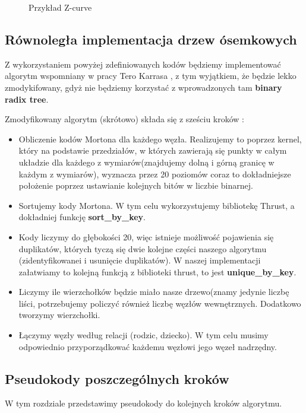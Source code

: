 \documentclass[14pt,twoside,a4paper]{article}
\theoremstyle{definition}
\begin{document}
\begin{figure}[h]
    \centering      
    \def\svgscale{0.53}
    
    \caption{Przykład Z-curve}
    \label{fig:krzywa}
\end{figure}

\subsection{\Large Równoległa implementacja drzew ósemkowych}
Z wykorzystaniem powyżej zdefiniowanych kodów będziemy implementować algorytm wspomniany w pracy Tero Karrasa \cite{tero}, z tym wyjątkiem, że będzie lekko zmodykifowany, gdyż nie będziemy korzystać z wprowadzonych tam \textbf{binary radix tree}.

Zmodyfikowany algorytm (skrótowo) składa się z sześciu kroków :
\begin{itemize}
\item Obliczenie kodów Mortona dla każdego węzła. Realizujemy to poprzez kernel, który na podstawie przedziałów, w których zawierają się punkty w całym układzie dla każdego z wymiarów(znajdujemy dolną i górną granicę w każdym z wymiarów), wyznacza przez 20 poziomów coraz to dokładniejsze położenie poprzez ustawianie kolejnych bitów w liczbie binarnej. 
\item Sortujemy kody Mortona. W tym celu wykorzystujemy bibliotekę Thrust, a dokładniej funkcję \textbf{sort\_by\_key}. 
\item Kody liczymy do głębokości 20, więc istnieje możliwość pojawienia się duplikatów, których tyczą się dwie kolejne części naszego algorytmu (zidentyfikowanei i usunięcie duplikatów). W naszej implementacji załatwiamy to kolejną funkcją z biblioteki thrust, to jest \textbf{unique\_by\_key}.
\item Liczymy ile wierzchołków będzie miało nasze drzewo(znamy jedynie liczbę liści, potrzebujemy policzyć również liczbę węzłów wewnętrznych. Dodatkowo tworzymy wierzchołki.
\item  Łączymy węzły według relacji (rodzic, dziecko). W tym celu musimy odpowiednio przyporządkować każdemu węzłowi jego węzeł nadrzędny.
\end{itemize}

\subsection{\Large Pseudokody poszczególnych kroków}
W tym rozdziale przedstawimy pseudokody do kolejnych kroków algorytmu.
\end{document}
